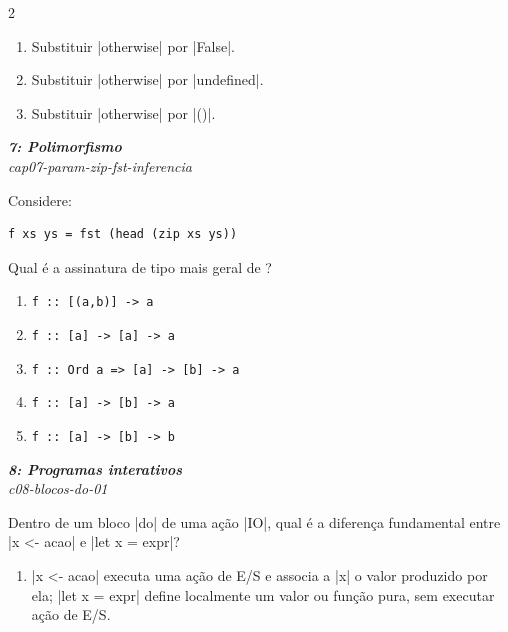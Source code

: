 \documentclass[a4paper,10pt,brazil]{article}
\begin{document}
\begin{multicols}{2}
\begin{enumerate}
  \item Substituir \haskellinline|otherwise| por \haskellinline|False|.

  \item Substituir \haskellinline|otherwise| por \haskellinline|undefined|.

  \item Substituir \haskellinline|otherwise| por \haskellinline|()|.


\end{enumerate}

\begin{flushright}
  \footnotesize
  \textit{\textbf{7: Polimorfismo}}\\
  \textit{cap07-param-zip-fst-inferencia}\\

\end{flushright}
Considere:

\begin{verbatim}
f xs ys = fst (head (zip xs ys))
\end{verbatim}

Qual é a assinatura de tipo mais geral de ?

\begin{enumerate}
  \item \texttt{f :: [(a,b)] -> a}
  \item \texttt{f :: [a] -> [a] -> a}
  \item \texttt{f :: Ord a => [a] -> [b] -> a}
  \item \texttt{f :: [a] -> [b] -> a}
  \item \texttt{f :: [a] -> [b] -> b}

\end{enumerate}

\begin{flushright}
  \footnotesize
  \textit{\textbf{8: Programas interativos}}\\
  \textit{c08-blocos-do-01}\\

\end{flushright}
Dentro de um bloco \haskellinline|do| de uma ação \haskellinline|IO|, qual é a diferença fundamental entre \haskellinline|x <- acao| e \haskellinline|let x = expr|?

\begin{enumerate}
  \item \haskellinline|x <- acao| executa uma ação de E/S e associa a \haskellinline|x| o valor produzido por ela; \haskellinline|let x = expr| define localmente um valor ou função pura, sem executar ação de E/S.


\end{enumerate}
\end{multicols}
\end{document}
